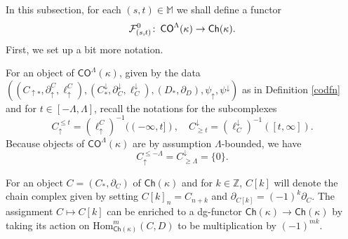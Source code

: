 \documentclass[11pt]{amsart}
\theoremstyle{definition}
\theoremstyle{remark}
\numberwithin{equation}{section}
\def\co{\colon\thinspace}
\def\Z{\mathbb{Z}}
\begin{document}
In this subsection, for each $(s,t)\in\mathbb{M}$ we shall define a functor \[ \mathcal{F}^{0}_{(s,t)}\co \mathsf{CO}^{\Lambda}(\kappa)\to \mathsf{Ch}(\kappa). \]  
First, we set up a bit more notation.

For an object of $\mathsf{CO}^{\Lambda}(\kappa)$, given by the data $\left((C_{\uparrow *},\partial_{\uparrow}^C,\ell_{\uparrow}^C),(C^{\downarrow}_{*},\partial^{\downarrow}_C,\ell^{\downarrow}_C),(D_*,\partial_D),\psi_{\uparrow},\psi^{\downarrow}\right)$ as in Definition \ref{codfn} and for $t\in [-\Lambda,\Lambda]$, recall the notations for the subcomplexes \begin{equation}\label{subcxs} C_{\uparrow}^{\leq t}=(\ell_{\uparrow}^{C})^{-1}((-\infty,t]),\quad C^{\downarrow}_{\geq t}=(\ell^{\downarrow}_{C})^{-1}([t,\infty]).  \end{equation}
Because objects of $\mathsf{CO}^{\Lambda}(\kappa)$ are by assumption $\Lambda$-bounded, we have \[ C_{\uparrow}^{\leq -\Lambda}=C^{\downarrow}_{\geq \Lambda}=\{0\}.\]





For an object $C=(C_*,\partial_C)$ of $\mathsf{Ch}(\kappa)$ and for $k\in \Z$, $C[k]$ will denote the chain complex given by setting $C[k]_n=C_{n+k}$ and $\partial_{C[k]}=(-1)^k\partial_C$.  The assignment $C\mapsto C[k]$ can be enriched to a dg-functor $\mathsf{Ch}(\kappa)\to\mathsf{Ch}(\kappa)$ by taking its action on $\mathrm{Hom}_{\mathsf{Ch}(\kappa)}^{m}(C,D)$ to be multiplication by $(-1)^{mk}$.
\end{document}
